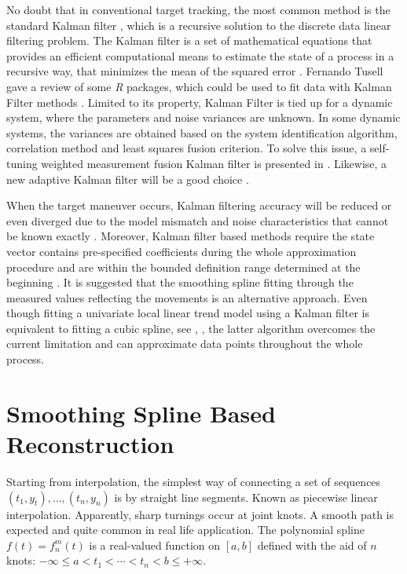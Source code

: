 No doubt that in conventional target tracking, the most common method is the standard Kalman filter \cite{kalman1960new}, which is a recursive solution to the discrete data linear filtering problem. The Kalman filter is a set of mathematical equations that provides an efficient computational means to estimate the state of a process in a recursive way, that minimizes the mean of the squared error \cite{bishop2001introduction}. Fernando Tusell gave a review of some \textit{R} packages, which could be used to fit data with Kalman Filter methods \cite{tusell2011kalman}. Limited to its property, Kalman Filter is tied up for a dynamic system, where the parameters and noise variances are unknown. In some dynamic systems, the variances are obtained based on the system identification algorithm, correlation method and least squares fusion criterion. To solve this issue, a self-tuning weighted measurement fusion Kalman filter is presented in \cite{ran2010self}. Likewise, a new adaptive Kalman filter will be a good choice \cite{oussalah2001adaptive}. 

When the target maneuver occurs, Kalman filtering accuracy will be reduced or even diverged due to the model mismatch and noise characteristics that cannot be known exactly \cite{liu2014filtering}. Moreover, Kalman filter based methods require the state vector contains pre-specified coefficients during the whole approximation procedure and are within the bounded definition range determined at the beginning \cite{jauch2017recursive}. It is suggested that the smoothing spline fitting through the measured values reflecting the movements is an alternative approach. Even though fitting a univariate local linear trend model using a Kalman filter is equivalent to fitting a cubic spline, see \cite{eubank2004simple}, \cite{durbin2012time}, the latter algorithm overcomes the current limitation and can approximate data points throughout the whole process. 




\section{Smoothing Spline Based Reconstruction}

Starting from interpolation, the simplest way of connecting a set of sequences $(t_1,y_t),\ldots, (t_n,y_n)$ is by straight line segments. Known as piecewise
linear interpolation. Apparently, sharp turnings occur at joint knots. A smooth path is expected and quite common in real life application. The polynomial spline $f(t) = f_n^m(t)$ is a real-valued function on $[a,b]$ defined with the aid of $n$ knots: $-\infty \leq a <t_1 <\cdots <t_n<b\leq +\infty$. 


